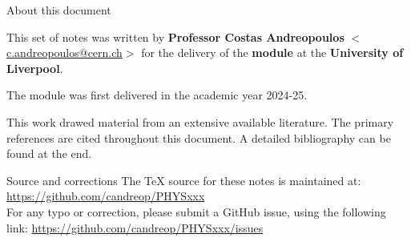 
\begin{frame}{About this document}

{\scriptsize
  This set of notes was written by
  {\bf Professor Costas Andreopoulos} $<$\href{mailto:c.andreopoulos@cern.ch}{c.andreopoulos@cern.ch}$>$
  for the delivery of the
  {\bf \modulename module}
  at the {\bf University of Liverpool}.\\
  \vspace{0.2cm}

  The module was first delivered in the academic year 2024-25.

  \vspace{0.2cm}

  This work drawed material from an extensive available literature.
  The primary references are cited throughout this document.
  A detailed bibliography can be found at the end.

  \vspace{0.3cm}

  \begin{block001}{Source and corrections}
  The TeX source for these notes is maintained at:\\
  {\color{blue} \url{https://github.com/candreop/PHYSxxx}}\\
  \vspace{0.2cm}
  For any typo or correction, please submit a GitHub issue, using
  the following link: {\color{blue} \url{https://github.com/candreop/PHYSxxx/issues}}
  \end{block001}
}
\end{frame}
 
